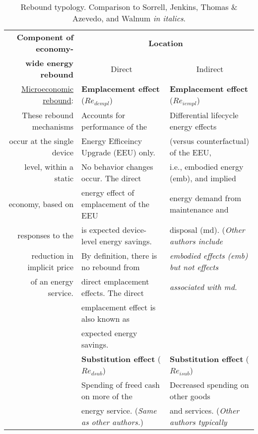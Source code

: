 \begin{table}
\footnotesize
\begin{center}
\caption{Rebound typology. Comparison to Sorrell, Jenkins, Thomas \& Azevedo, and Walnum \emph{in italics}.}
\label{tab:rebound_typology}
\begin{tabular}{ r l l }
\toprule
\textbf{Component of economy-}     &  \multicolumn{2}{c}{\textbf{Location}} \\ 
\textbf{wide energy rebound}       & \multicolumn{1}{c}{Direct}                  & \multicolumn{1}{c}{Indirect} \\
\midrule
\underline{Microeconomic rebound}: & \textbf{Emplacement effect} ($Re_{dempl}$)  & \textbf{Emplacement effect} ($Re_{iempl}$) \\
These rebound mechanisms           & Accounts for performance of the             & Differential lifecycle energy effects \\
occur at the single device         & Energy Efficeincy Upgrade (EEU) only.       & (versus counterfactual) of the EEU, \\
level, within a static             & No behavior changes occur. The direct       & i.e., embodied energy (emb), and implied \\
economy, based on                  & energy effect of emplacement of the EEU     & energy demand from maintenance and \\
responses to the                   & is expected device-level energy savings.    & disposal (md). (\emph{Other authors include} \\
reduction in implicit price        & By definition, there is no rebound from     & \emph{embodied effects (emb) but not effects} \\
of an energy service.              & direct emplacement effects. The direct      & \emph{associated with md.} \\
                                   & emplacement effect is also known as         & \\
                                   & expected energy savings.                    & \\
                                   \cmidrule{2-3}
                                   & \textbf{Substitution effect} ($Re_{dsub}$)  & \textbf{Substitution effect} ($Re_{isub}$) \\
                                   & Spending of freed cash on more of the       & Decreased spending on other goods  \\
                                   & energy service. (\emph{Same as other authors.})    & and services. (\emph{Other authors typically} \\

\end{tabular}
\end{center}
\end{table}
